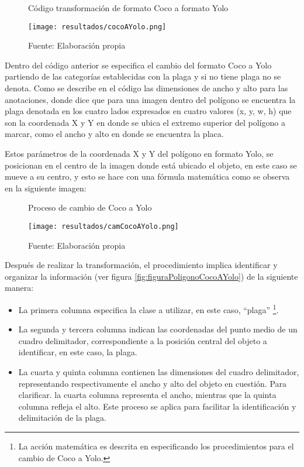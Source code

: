 \begin{figure}[h]
\centering
\caption{Código transformación de formato Coco a formato Yolo}
\texttt{[image: resultados/cocoAYolo.png]}
\caption*{\footnotesize Fuente: Elaboración propia}
\label{fig:figuraCocoAYolo}
\end{figure}

\newpage

Dentro del código anterior se especifica el cambio del formato Coco a Yolo partiendo de las categorías establecidas con la plaga y si no tiene plaga no se denota. Como se describe en el código las dimensiones de ancho y alto para las anotaciones, donde dice que para una imagen dentro del polígono se encuentra la plaga denotada en los cuatro lados expresados en cuatro valores (x, y, w, h) que son la coordenada X y Y en donde se ubica el extremo superior del polígono a marcar, como el ancho y alto en donde se encuentra la placa.

Estos parámetros de la coordenada X y Y del polígono en formato Yolo, se posicionan en el centro de la imagen donde está ubicado el objeto, en este caso se mueve a su centro, y esto se hace con una fórmula matemática  como se observa en la siguiente imagen:


\begin{figure}[h]
\centering
\caption{Proceso de cambio de Coco a Yolo}
\texttt{[image: resultados/camCocoAYolo.png]}
\caption*{\footnotesize Fuente: Elaboración propia}
\label{fig:figuraCamCocoAYolo}
\end{figure}

Después de realizar la transformación, el procedimiento implica identificar y organizar la información (ver figura \ref{fig:figuraPoligonoCocoAYolo}) de la siguiente manera:
\begin{itemize}
    \item La primera columna especifica la clase a utilizar, en este caso, ``plaga'' \footnote{La acción matemática es descrita en \cite{rehman2022conversion} especificando los procedimientos para el cambio de Coco a Yolo.}. 
    \item La segunda y tercera columna indican las coordenadas del punto medio de un cuadro delimitador, correspondiente a la posición central del objeto a identificar, en este caso, la plaga. 
    \item La cuarta y quinta columna contienen las dimensiones del cuadro delimitador, representando respectivamente el ancho y alto del objeto en cuestión. Para clarificar. la cuarta columna representa el ancho, mientras que la quinta columna refleja el alto. Este proceso se aplica para facilitar la identificación y delimitación de la plaga.
\end{itemize}

